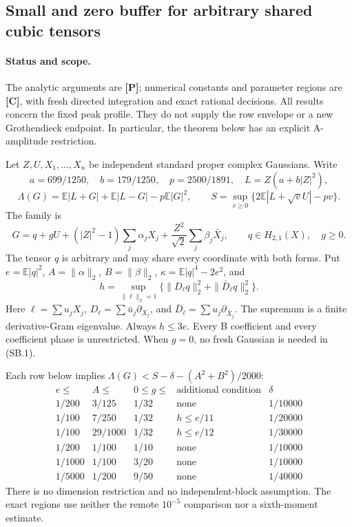 \subsection{Small and zero buffer for arbitrary shared cubic tensors}
\label{sec:sbt}

\paragraph{Status and scope.}
The analytic arguments are \textbf{[P]}; numerical constants and parameter
regions are \textbf{[C]}, with fresh directed integration and exact
rational decisions. All results concern the fixed peak profile.
They do not supply the row envelope or a new Grothendieck endpoint.
In particular, the theorem below has an explicit A-amplitude restriction.

Let \(Z,U,X_1,\dots,X_n\) be independent standard proper complex
Gaussians. Write
\[
 a=699/1250,\quad b=179/1250,\quad p=2500/1891,\quad
 L=Z(a+b|Z|^2),
\]
\[
 \Lambda(G)=\mathbb E|L+G|+\mathbb E|L-G|-p\mathbb E|G|^2,
 \qquad
 S=\sup_{v\ge0}\{2\mathbb E|L+\sqrt vU|-pv\}.
\]
The family is
\[
 G=q+gU+(|Z|^2-1)\sum_j\alpha_jX_j+
       \frac{Z^2}{\sqrt2}\sum_j\beta_j\bar X_j,\qquad
 q\in H_{2,1}(X),\quad g\ge0.
 \tag{SB.1}
\]
The tensor \(q\) is arbitrary and may share every coordinate with
both forms. Put \(e=\mathbb E|q|^2\), \(A=\|\alpha\|_2\),
\(B=\|\beta\|_2\), \(\kappa=\mathbb E|q|^4-2e^2\), and
\[
 h=\sup_{\|\ell\|_2=1}
       \{\|D_\ell q\|_2^2+\|\bar D_\ell q\|_2^2\}.
 \tag{SB.2}
\]
Here \(\ell=\sum u_jX_j\),
\(D_\ell=\sum\bar u_j\partial_{X_j}\), and
\(\bar D_\ell=\sum u_j\partial_{\bar X_j}\).
The supremum is a finite derivative-Gram eigenvalue. Always \(h\le3e\).
Every B coefficient and every coefficient phase is unrestricted.
When \(g=0\), no fresh Gaussian is needed in (SB.1).

\begin{theorem}
\label{thm:sbt-exact}
Each row below implies
\(\Lambda(G)<S-\delta-(A^2+B^2)/2000\):
\[
\begin{array}{c|c|c|c|c}
e\le&A\le&0\le g\le&\text{additional condition}&
\delta\\ \hline
1/200&3/125&1/32&\text{none}
 &1/10000\\
1/100&7/250&1/32&h\le e/11
 &1/20000\\
1/100&29/1000&1/32&h\le e/12
 &1/30000\\
1/200&1/100&1/10&\text{none}
 &1/10000\\
1/1000&1/100&3/20&\text{none}
 &1/10000\\
1/5000&1/200&9/50&\text{none}
 &1/40000
\end{array}
\tag{SB.3}
\]
There is no dimension restriction and no independent-block assumption.
The exact regions use neither the remote \(10^{-5}\) comparison nor
a sixth-moment estimate.
\end{theorem}

